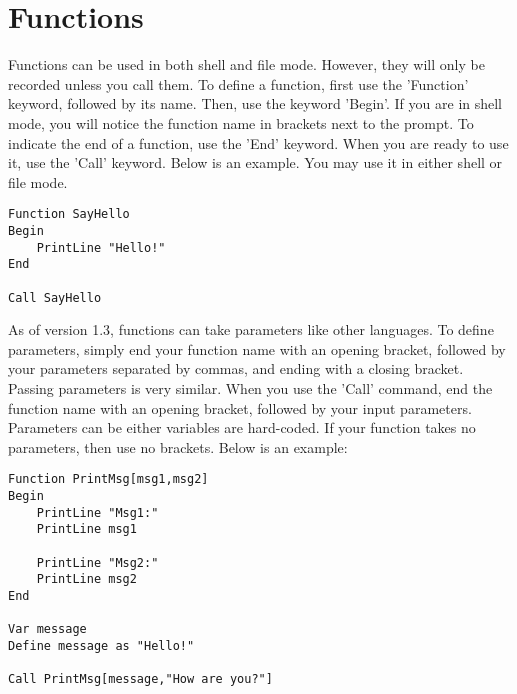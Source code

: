 \documentclass{report}
\begin{document}
\section{Functions}

Functions can be used in both shell and file mode. However, they will only be recorded unless you call them. To define a function, first use the 'Function' keyword, followed by its name. Then, use the keyword 'Begin'. If you are in shell mode, you will notice the function name in brackets next to the prompt. To indicate the end of a function, use the 'End' keyword. When you are ready to use it, use the 'Call' keyword. Below is an example. You may use it in either shell or file mode.

\begin{lstlisting}
Function SayHello
Begin
	PrintLine "Hello!"
End

Call SayHello
\end{lstlisting}

As of version 1.3, functions can take parameters like other languages. To define parameters, simply end your function name with an opening bracket, followed by your parameters separated by commas, and ending with a closing bracket. Passing parameters is very similar. When you use the 'Call' command, end the function name with an opening bracket, followed by your input parameters. Parameters can be either variables are hard-coded. If your function takes no parameters, then use no brackets. Below is an example:

\begin{lstlisting}
Function PrintMsg[msg1,msg2]
Begin
	PrintLine "Msg1:"
	PrintLine msg1
	
	PrintLine "Msg2:"
	PrintLine msg2
End

Var message
Define message as "Hello!"

Call PrintMsg[message,"How are you?"]
\end{lstlisting}
\end{document}
